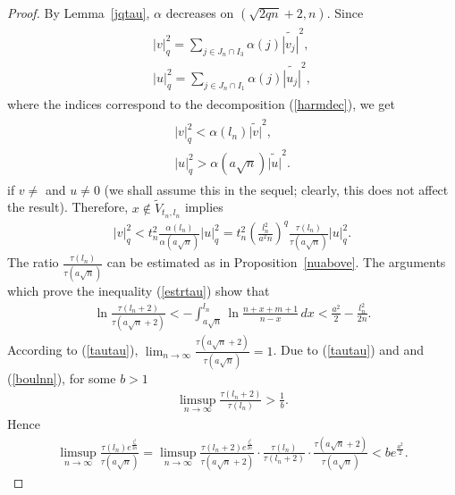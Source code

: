 \documentclass[10pt]{amsart}
\theoremstyle{remark}
\let\td=\tilde
\let\wtd=\widetilde
\begin{document}
\begin{proof}
By Lemma~\ref{jqtau}, ${{\mathord{\alpha}}}$ decreases on $(\sqrt{2qn}+2,n)$. Since
\begin{eqnarray*}\label{tdtolt}
\begin{array}{r}
|v|_q^2=\sum\limits_{j\in J_n\cap I_3}{{\mathord{\alpha}}}(j)\wtd{|v_j|}^2,\\
|u|_q^2=\sum\limits_{j\in J_n\cap I_1}{{\mathord{\alpha}}}(j)\wtd{|u_j|}^2,
\end{array}
\end{eqnarray*}
where the indices correspond to the decomposition (\ref{harmdec}),
we get
\begin{eqnarray*}\label{vkineq}
\begin{array}{r}
|v|_q^2<{{\mathord{\alpha}}}(l_n)\wtd{|v|}^2,\\%
|u|_q^2>{{\mathord{\alpha}}}(a\sqrt{n})\wtd{|u|}^2.
\end{array}
\end{eqnarray*}
if $v\neq$ and $u\neq0$ (we shall assume this in the sequel;
clearly, this does not affect the result). Therefore, $x\notin\td
V_{t_n,l_n}$ implies
\begin{eqnarray}\label{vquqtn}
|v|_q^2
<t_n^2\frac{{{\mathord{\alpha}}}(l_n)}{{{\mathord{\alpha}}}(a\sqrt{n})}|u|_q^2
=t_n^2\left(\frac{l_n^2}{a^2n}\right)^q
\frac{\tau(l_n)}{\tau(a\sqrt{n})}|u|_q^2.
\end{eqnarray}
The ratio $\frac{\tau(l_n)}{\tau(a\sqrt{n})}$ can be estimated as
in Proposition~\ref{nuabove}. The arguments which prove the
inequality (\ref{estrtau}) show that
\begin{eqnarray}\label{lntauaa}
\ln\frac{\tau(l_n+2)}{\tau(a\sqrt{n}+2)}<
{-\int_{a\sqrt{n}}^{l_n}\ln\frac{n+x+m+1}{n-x}\,dx}
<{\frac{a^2}{2}-\frac{l_n^2}{2n}}.
\end{eqnarray}
According to (\ref{tautau}),
$\lim_{n\to\infty}\frac{\tau(a\sqrt{n}+2)}{\tau(a\sqrt{n})}=1$.
Due to (\ref{tautau}) and  and (\ref{boulnn}), for some $b>1$
\begin{eqnarray*}
\limsup_{n\to\infty}\frac{\tau(l_n+2)}{\tau(l_n)}>\frac1b.
\end{eqnarray*}
Hence
\begin{eqnarray}\label{easqtau}
\limsup_{n\to\infty}\frac{\tau(l_n)e^{\frac{l_n^2}{2n}}}{\tau(a\sqrt{n})}
=\limsup_{n\to\infty}\frac{\tau(l_n+2)e^{\frac{l_n^2}{2n}}}{\tau(a\sqrt{n}+2)}
\cdot\frac{\tau(l_n)}{\tau(l_n+2)}\cdot\frac{\tau(a\sqrt{n}+2)}{\tau(a\sqrt{n})}
<be^{\frac{a^2}{2}}.
\end{eqnarray}

\end{proof}
\end{document}
